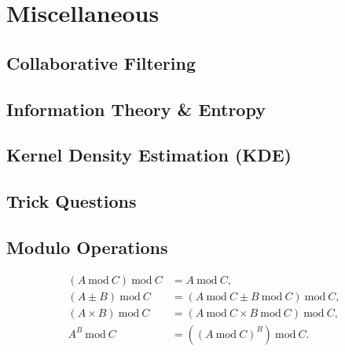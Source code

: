 \chapter{Miscellaneous}
\label{chap:misc}

\section{Collaborative Filtering}
\label{misc:CF}

\section{Information Theory \& Entropy}
\label{misc:info_theory}

\section{Kernel Density Estimation (KDE)}
\label{misc:KDE}

\section{Trick Questions}
\label{misc:trick}

\section{Modulo Operations}
\label{misc:modulo}

\begin{subequations}\label{eq:misc:modulo}
\begin{align}
\left(A~\text{mod}~C\right)~\text{mod}~C &= A~\text{mod}~C, \label{eq:misc:modulo:basic} \\
\left(A \pm B\right)~\text{mod}~C &= \left(A~\text{mod}~C \pm B~\text{mod}~C\right)~\text{mod}~C, \label{eq:misc:modulo:pm} \\
\left(A \times B\right)~\text{mod}~C &= \left(A~\text{mod}~C \times B~\text{mod}~C\right)~\text{mod}~C, \label{eq:misc:modulo:multiplication} \\
A^{B}~\text{mod}~C &= \left(\left(A~\text{mod}~C\right)^{B}\right)~\text{mod}~C. \label{eq:misc:modulo:exp}
\end{align}
\end{subequations}

